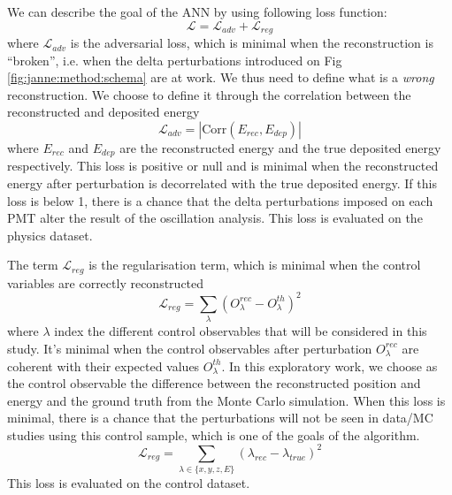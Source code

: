 \documentclass[../main.tex]{subfiles}
\begin{document}
We can describe the goal of the ANN by using following loss function:
\begin{equation}
  \label{eq:janne:loss}
  \mathcal{L} = \mathcal{L}_{adv} + \mathcal{L}_{reg}
\end{equation}
where $\mathcal{L}_{adv}$ is the adversarial loss, which is minimal when the reconstruction is ``broken'', i.e. when the delta perturbations introduced on Fig \ref{fig:janne:method:schema} are at work. We thus need to define what is a \textit{wrong} reconstruction. We choose to define it through the correlation between the reconstructed and deposited energy
\begin{equation}
  \label{eq:janne:ladv}
  \mathcal{L}_{adv} = |\mathrm{Corr}(E_{rec}, E_{dep})|
\end{equation}
where $E_{rec}$ and $E_{dep}$ are the reconstructed energy and the true deposited energy respectively.
This loss is positive or null and is minimal when the reconstructed energy after perturbation is decorrelated with the true deposited energy. If this loss is below 1, there is a chance that the delta perturbations imposed on each PMT alter the result of the oscillation analysis. This loss is evaluated on the physics dataset.

The term $\mathcal{L}_{reg}$ is the regularisation term, which is minimal when the control variables are correctly reconstructed
\begin{equation}
  \mathcal{L}_{reg} = \sum_\lambda (O^{rec}_\lambda - O^{th}_\lambda)^2
\end{equation}
where $\lambda$ index the different control observables that will be considered in this study. It's minimal when the control observables after perturbation $O^{rec}_\lambda$ are coherent with their expected values $O^{th}_\lambda$.
In this exploratory work, we choose as the control observable the difference between the reconstructed position and energy and the ground truth from the Monte Carlo simulation. When this loss is minimal, there is a chance that the perturbations will not be seen in data/MC  studies using this control sample, which is one of the goals of the algorithm.
\begin{equation}
  \label{eq:janne:lreg}
  \mathcal{L}_{reg} = \sum_{\lambda \in \{x, y, z, E\}} (\lambda_{rec} - \lambda_{true})^2
\end{equation}
This loss is evaluated on the control dataset.
\end{document}
